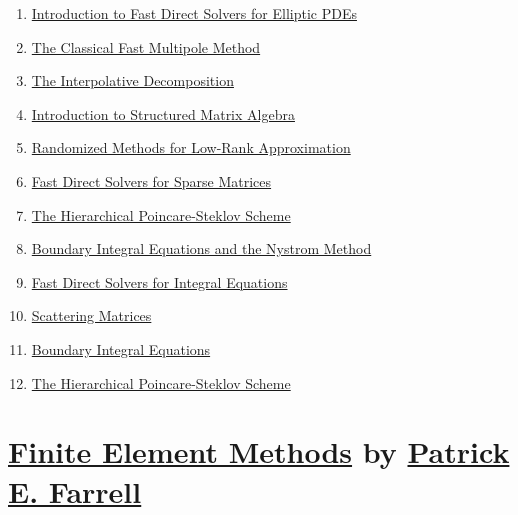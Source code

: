 \documentclass[11pt]{article}
\begin{document}
\begin{enumerate}
	\item \href{https://mp.weixin.qq.com/s/aZB5u9s8NX14hOYiKyoMrA}{Introduction to Fast Direct Solvers for Elliptic PDEs}	%
	\item \href{https://mp.weixin.qq.com/s/F2kv8fQLT5PrC2EqJIwCxQ}{The Classical Fast Multipole Method}	%
	\item \href{https://mp.weixin.qq.com/s/EupcrHQHWLgbv1d-bp_Mug}{The Interpolative Decomposition}	%
	\item \href{https://mp.weixin.qq.com/s/vobB75Lt9yB6dUUOTyhAHg}{Introduction to Structured Matrix Algebra}	%
	\item \href{https://mp.weixin.qq.com/s/G2zotWw_6vqRpONOlGi6lA}{Randomized Methods for Low-Rank Approximation}	%
	\item \href{https://mp.weixin.qq.com/s/lsrYnedCLAlVpctjo3wrzQ}{Fast Direct Solvers for Sparse Matrices}	%
	\item \href{https://mp.weixin.qq.com/s/sq1mjoMmMg9w56Ws9xzz0w}{The Hierarchical Poincare-Steklov Scheme}	%
	\item \href{https://mp.weixin.qq.com/s/hiLSb1CdVENvSovecHc9NQ}{Boundary Integral Equations and the Nystrom Method}	%
	\item \href{https://mp.weixin.qq.com/s/LBothkzZ4MM8XplY0G0nhA}{Fast Direct Solvers for Integral Equations}	%
	\item \href{https://mp.weixin.qq.com/s/T22KD56q-UV6_kF2IRiyCQ}{Scattering Matrices}	%
	\item \href{https://mp.weixin.qq.com/s/EePCd0pfZGOA2JNa426rug}{Boundary Integral Equations}	%
	\item \href{https://mp.weixin.qq.com/s/ACP5c-D23-OiuzaUbY0OSw}{The Hierarchical Poincare-Steklov Scheme}	%
\end{enumerate}

\newpage

\section[Finite Element Methods]{{\large   \href{https://people.maths.ox.ac.uk/farrellp/femvideos/}{Finite Element Methods}} by {\large \href{https://pefarrell.org/}{Patrick E. Farrell}}}
\end{document}
